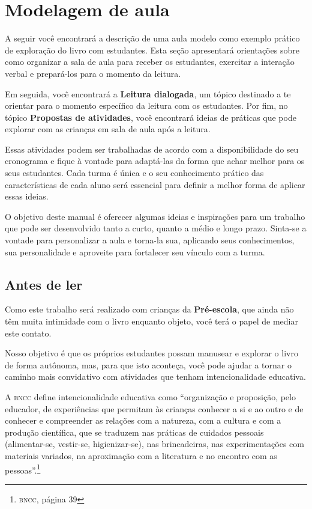\documentclass[11pt]{extarticle}
\begin{document}
{{\section{Modelagem de aula}
A seguir você encontrará a descrição de uma aula modelo como exemplo 
prático de exploração do livro com estudantes. Esta seção apresentará 
orientações sobre como organizar a sala de aula para receber os 
estudantes, exercitar a interação verbal e prepará-los para o 
momento da leitura.

Em seguida, você encontrará a \textbf{Leitura dialogada}, um 
tópico destinado a te orientar para o momento específico da 
leitura com os estudantes. Por fim, no tópico 
\textbf{Propostas de atividades}, você encontrará ideias 
de práticas que pode explorar com as crianças em sala de 
aula após a leitura. 

Essas atividades podem ser trabalhadas de acordo com a 
disponibilidade do seu cronograma e fique à vontade para adaptá-las 
da forma que achar melhor para os seus estudantes. Cada turma é única 
e o seu conhecimento prático das características de cada aluno será 
essencial para definir a melhor forma de aplicar essas ideias. 

O objetivo deste manual é oferecer algumas ideias 
e inspirações para um trabalho que pode ser desenvolvido tanto 
a curto, quanto a médio e longo prazo. Sinta-se a vontade para 
personalizar a aula e torna-la sua, aplicando seus conhecimentos, sua 
personalidade e aproveite para fortalecer 
seu vínculo com a turma.


\subsection{Antes de ler}


Como este trabalho será realizado com crianças da \textbf{Pré-escola}, 
que ainda não têm muita intimidade com o livro enquanto objeto, você terá o 
papel de mediar este contato. 

Nosso objetivo é que os próprios estudantes possam manusear 
e explorar o livro de forma autônoma, mas, para que isto aconteça, você 
pode ajudar a tornar o caminho mais convidativo com atividades que tenham 
intencionalidade educativa. 

A \textsc{bncc} define intencionalidade educativa como ``organização 
e proposição, pelo educador, de experiências que permitam às crianças 
conhecer a si e ao outro e de conhecer e compreender as relações com a 
natureza, com a cultura e com a produção científica, que se traduzem nas 
práticas de cuidados pessoais (alimentar-se, vestir-se, higienizar-se), 
nas brincadeiras, nas experimentações com materiais 
variados, na aproximação com a literatura e no encontro com as 
pessoas''.\footnote{\textsc{bncc}, página 39}

}}
\end{document}
